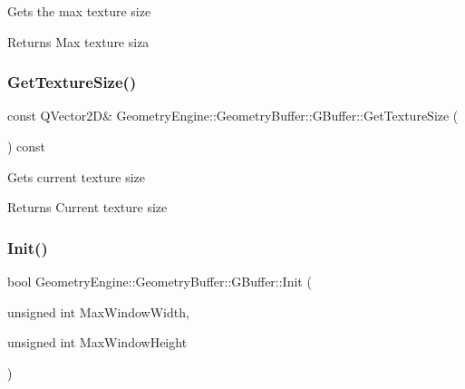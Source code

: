 Gets the max texture size \begin{DoxyReturn}{Returns}
Max texture siza 
\end{DoxyReturn}
\mbox{\label{class_geometry_engine_1_1_geometry_buffer_1_1_g_buffer_a2b829115597fc587cd6f4ddb52b875cc}} 
\subsubsection{\texorpdfstring{GetTextureSize()}{GetTextureSize()}}
{\footnotesize\ttfamily const Q\+Vector2D\& Geometry\+Engine\+::\+Geometry\+Buffer\+::\+G\+Buffer\+::\+Get\+Texture\+Size (\begin{DoxyParamCaption}{ }\end{DoxyParamCaption}) const\hspace{0.3cm}{\ttfamily [inline]}}

Gets current texture size \begin{DoxyReturn}{Returns}
Current texture size 
\end{DoxyReturn}
\mbox{\label{class_geometry_engine_1_1_geometry_buffer_1_1_g_buffer_ad4d5684575aa5819a91097a1b6a0e8df}} 
\subsubsection{\texorpdfstring{Init()}{Init()}}
{\footnotesize\ttfamily bool Geometry\+Engine\+::\+Geometry\+Buffer\+::\+G\+Buffer\+::\+Init (\begin{DoxyParamCaption}\item[{unsigned int}]{Max\+Window\+Width,  }\item[{unsigned int}]{Max\+Window\+Height }\end{DoxyParamCaption})}

